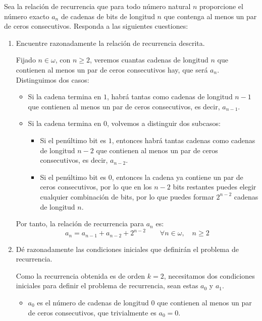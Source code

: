 \documentclass[12pt]{article}
\begin{document}
    \begin{ejercicio}
        Sea la relación de recurrencia que para todo número natural $n$ proporcione
        el número exacto $a_n$ de cadenas de bits de longitud $n$ que contenga al menos un par de ceros
        consecutivos. Responda a las siguientes cuestiones:
        \begin{enumerate}
            \item Encuentre razonadamente la relación de recurrencia descrita.
            
            Fijado $n\in \omega$, con $n\geq 2$, veremos cuantas cadenas de longitud $n$ que contienen al menos un par de ceros consecutivos hay, que será $a_n$.
            Distinguimos dos casos:
            \begin{itemize}
                \item Si la cadena termina en $1$, habrá tantas como cadenas de longitud $n-1$ que contienen al menos un par de ceros consecutivos,
                es decir, $a_{n-1}$.

                \item Si la cadena termina en $0$, volvemos a distinguir dos subcasos:
                \begin{itemize}
                    \item Si el penúltimo bit es $1$, entonces habrá tantas cadenas como cadenas de longitud $n-2$ que contienen al menos un par de ceros consecutivos,
                    es decir, $a_{n-2}$.

                    \item Si el penúltimo bit es $0$, entonces la cadena ya contiene un par de ceros consecutivos, por lo que en los $n-2$ bits restantes
                    puedes elegir cualquier combinación de bits, por lo que puedes formar $2^{n-2}$ cadenas de longitud $n$.
                \end{itemize}
            \end{itemize}

            Por tanto, la relación de recurrencia para $a_n$ es:
            \begin{equation*}
                a_n = a_{n-1} + a_{n-2} + 2^{n-2} \qquad \forall n\in \omega, \quad n\geq 2
            \end{equation*}


            \item Dé razonadamente las condiciones iniciales que definirán el problema de recurrencia.
            
            Como la recurrencia obtenida es de orden $k=2$, necesitamos dos condiciones iniciales para definir el problema de recurrencia,
            sean estas $a_0$ y $a_1$.
            \begin{itemize}
                \item $a_0$ es el número de cadenas de longitud $0$ que contienen al menos un par de ceros consecutivos,
                que trivialmente es $a_0=0$.


\end{itemize}
\end{enumerate}
\end{ejercicio}
\end{document}
